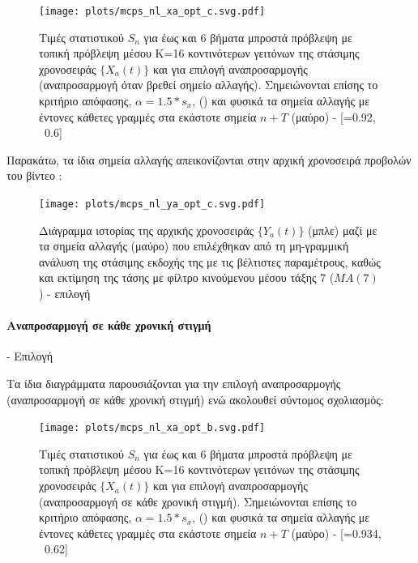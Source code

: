 \begin{figure}[H]
    \begin{center}
        \texttt{[image: plots/mcps\_nl\_xa\_opt\_c.svg.pdf]}
        \caption{Τιμές στατιστικού $S_n$ για έως και 6 βήματα μπροστά πρόβλεψη με τοπική πρόβλεψη μέσου Κ=16 κοντινότερων γειτόνων της στάσιμης χρονοσειράς $\{X_a(t)\}$ και για επιλογή αναπροσαρμογής  (αναπροσαρμογή όταν βρεθεί σημείο αλλαγής). Σημειώνονται επίσης το κριτήριο απόφασης, $\alpha=1.5*s_x$, () και φυσικά τα σημεία αλλαγής με έντονες κάθετες γραμμές στα εκάστοτε σημεία $n+T$ (μαύρο) - [=0.92, \ 0.6]}
        \label{fig:mcps_nl_xa_opt_c}
    \end{center}
\end{figure}

Παρακάτω, τα ίδια σημεία αλλαγής απεικονίζονται στην αρχική χρονοσειρά προβολών του βίντεο :

\begin{figure}[H]
    \begin{center}
        \texttt{[image: plots/mcps\_nl\_ya\_opt\_c.svg.pdf]}
        \caption{Διάγραμμα ιστορίας της αρχικής χρονοσειράς $\{Y_a(t)\}$ (μπλε) μαζί με τα σημεία αλλαγής (μαύρο) που επιλέχθηκαν από τη μη-γραμμική ανάλυση της στάσιμης εκδοχής της με τις βέλτιστες παραμέτρους, καθώς και εκτίμηση της τάσης με φίλτρο κινούμενου μέσου τάξης 7 ($MA(7)$ ) - επιλογή }
        \label{fig:mcps_nl_ya_opt_c}
    \end{center}
\end{figure}

\paragraph{Αναπροσαρμογή σε κάθε χρονική στιγμή}- Επιλογή 

Τα ίδια διαγράμματα παρουσιάζονται για την επιλογή αναπροσαρμογής  (αναπροσαρμογή σε κάθε χρονική στιγμή) ενώ ακολουθεί σύντομος σχολιασμός:

\begin{figure}[H]
    \begin{center}
        \texttt{[image: plots/mcps\_nl\_xa\_opt\_b.svg.pdf]}
        \caption{Τιμές στατιστικού $S_n$ για έως και 6 βήματα μπροστά πρόβλεψη με τοπική πρόβλεψη μέσου Κ=16 κοντινότερων γειτόνων της στάσιμης χρονοσειράς $\{X_a(t)\}$ και για επιλογή αναπροσαρμογής  (αναπροσαρμογή σε κάθε χρονική στιγμή). Σημειώνονται επίσης το κριτήριο απόφασης, $\alpha=1.5*s_x$, () και φυσικά τα σημεία αλλαγής με έντονες κάθετες γραμμές στα εκάστοτε σημεία $n+T$ (μαύρο) - [=0.934, \ 0.62]}
        \label{fig:mcps_nl_xa_opt_b}
    \end{center}
\end{figure}

